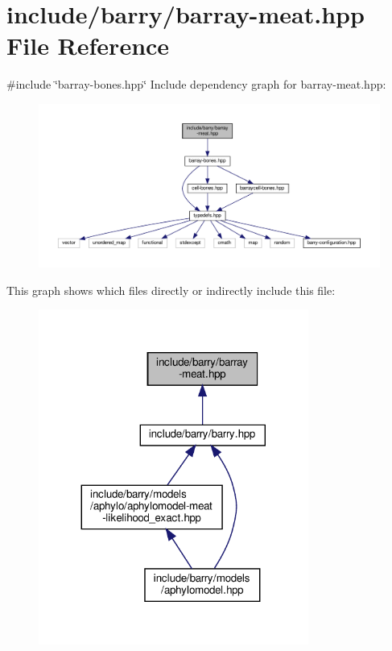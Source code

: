 \hypertarget{barray-meat_8hpp}{}\section{include/barry/barray-\/meat.hpp File Reference}
\label{barray-meat_8hpp}
{\ttfamily \#include \char`\"{}barray-\/bones.\+hpp\char`\"{}}\newline
Include dependency graph for barray-\/meat.hpp\+:\nopagebreak
\begin{figure}[H]
\begin{center}
\leavevmode
\includegraphics[width=350pt]{barray-meat_8hpp__incl}
\end{center}
\end{figure}
This graph shows which files directly or indirectly include this file\+:\nopagebreak
\begin{figure}[H]
\begin{center}
\leavevmode
\includegraphics[width=251pt]{barray-meat_8hpp__dep__incl}
\end{center}
\end{figure}

